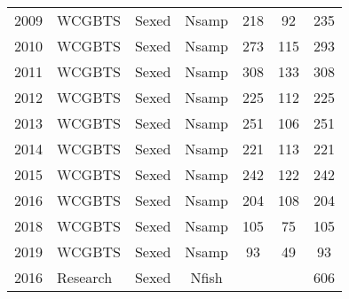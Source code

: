 \begin{longtable}[t]{c>{\centering\arraybackslash}p{3cm}ccccc}
2009 & WCGBTS & Sexed & Nsamp & 218 & 92 & 235\\
2010 & WCGBTS & Sexed & Nsamp & 273 & 115 & 293\\
2011 & WCGBTS & Sexed & Nsamp & 308 & 133 & 308\\
2012 & WCGBTS & Sexed & Nsamp & 225 & 112 & 225\\
2013 & WCGBTS & Sexed & Nsamp & 251 & 106 & 251\\
2014 & WCGBTS & Sexed & Nsamp & 221 & 113 & 221\\
2015 & WCGBTS & Sexed & Nsamp & 242 & 122 & 242\\
2016 & WCGBTS & Sexed & Nsamp & 204 & 108 & 204\\
2018 & WCGBTS & Sexed & Nsamp & 105 & 75 & 105\\
2019 & WCGBTS & Sexed & Nsamp & 93 & 49 & 93\\
2016 & Research & Sexed & Nfish &  &  & 606\\*
\end{longtable}
\endgroup{}
\endgroup{}
